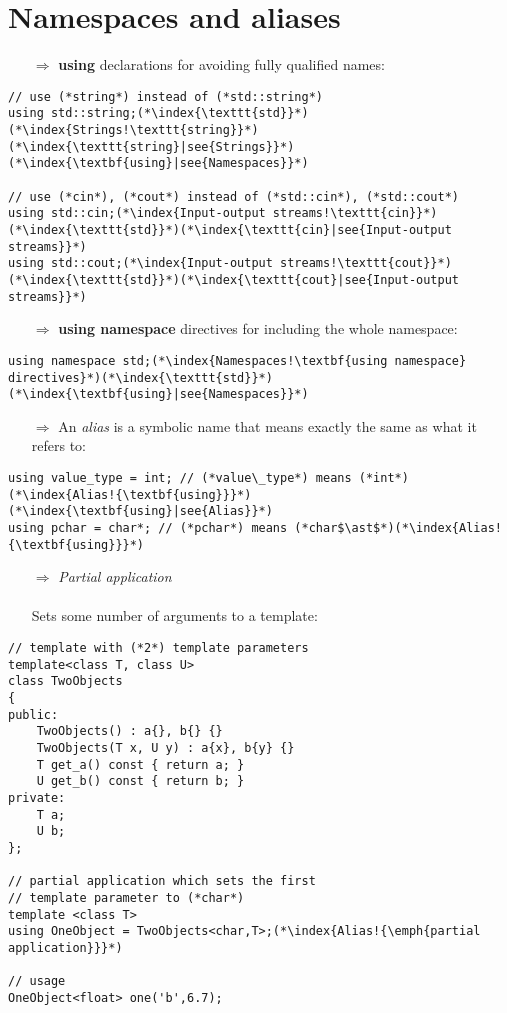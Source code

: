 \documentclass[10pt]{article}
\begin{document}
\section{Namespaces and aliases}
\small
\begin{enumerate}
\item[$\Rightarrow$] \textbf{using} declarations for avoiding fully qualified names:
\end{enumerate}
\begin{lstlisting}
// use (*string*) instead of (*std::string*)
using std::string;(*\index{\texttt{std}}*)(*\index{Strings!\texttt{string}}*)(*\index{\texttt{string}|see{Strings}}*)(*\index{\textbf{using}|see{Namespaces}}*)

// use (*cin*), (*cout*) instead of (*std::cin*), (*std::cout*)
using std::cin;(*\index{Input-output streams!\texttt{cin}}*)(*\index{\texttt{std}}*)(*\index{\texttt{cin}|see{Input-output streams}}*)
using std::cout;(*\index{Input-output streams!\texttt{cout}}*)(*\index{\texttt{std}}*)(*\index{\texttt{cout}|see{Input-output streams}}*)
\end{lstlisting}
\begin{enumerate}
\item[$\Rightarrow$] \textbf{using namespace} directives for including the whole namespace:
\end{enumerate}
\begin{lstlisting}
using namespace std;(*\index{Namespaces!\textbf{using namespace} directives}*)(*\index{\texttt{std}}*)(*\index{\textbf{using}|see{Namespaces}}*)
\end{lstlisting}
\begin{enumerate}
\item[$\Rightarrow$] An \emph{alias} is a symbolic name that means exactly the same as what it refers to:
\end{enumerate}
\begin{lstlisting}
using value_type = int; // (*value\_type*) means (*int*)(*\index{Alias!{\textbf{using}}}*)(*\index{\textbf{using}|see{Alias}}*)
using pchar = char*; // (*pchar*) means (*char$\ast$*)(*\index{Alias!{\textbf{using}}}*)
\end{lstlisting}
\begin{enumerate}
\item[$\Rightarrow$] \emph{Partial application}\\ \\ Sets some number of arguments to a template:
\end{enumerate}
\begin{lstlisting}
// template with (*2*) template parameters
template<class T, class U>
class TwoObjects
{
public:
    TwoObjects() : a{}, b{} {}
    TwoObjects(T x, U y) : a{x}, b{y} {}
    T get_a() const { return a; }
    U get_b() const { return b; }
private:
    T a;
    U b;
};

// partial application which sets the first
// template parameter to (*char*)
template <class T>
using OneObject = TwoObjects<char,T>;(*\index{Alias!{\emph{partial application}}}*)

// usage
OneObject<float> one('b',6.7);
\end{lstlisting}
%
%
\end{document}
